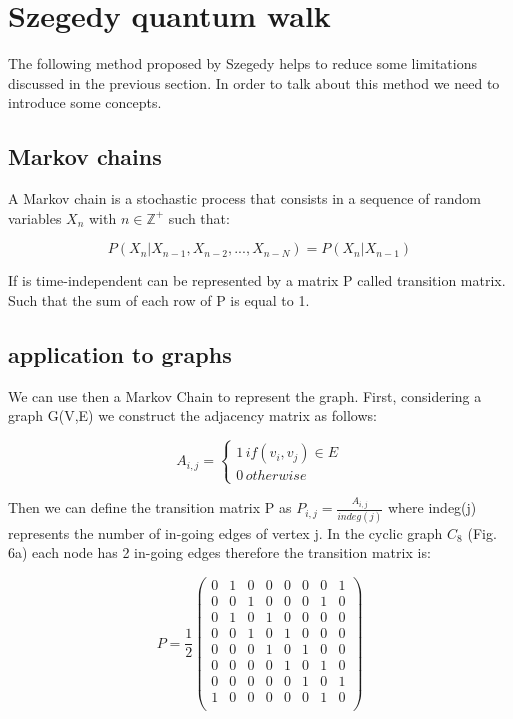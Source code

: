 \section{Szegedy quantum walk}

The following method proposed by Szegedy helps to reduce some limitations discussed in the previous section. In order to 
talk about this method we need to introduce some concepts.

\subsection{Markov chains}

A Markov chain is a stochastic process that consists in a sequence of random variables $X_{n}$ with $n \in \mathbb{Z}^{+}$
such that:

\begin{equation}
    \scriptstyle P(X_{n} | X_{n-1}, X_{n-2},...,X_{n-N}) = P(X_{n} | X_{n-1})
\end{equation}

If is time-independent can be represented by a matrix P called transition matrix. Such that the sum of each row of P is equal to 1.

\subsection{application to graphs}

We can use then a Markov Chain to represent the graph. First, considering a graph G(V,E) we construct the adjacency matrix
as follows:

\begin{equation}
    A_{i,j} = 
    \begin{cases} 
        1\, if (v_{i}, v_{j}) \in E \\
        0\, otherwise
    \end{cases}
\end{equation}

Then we can define the transition matrix P as $P_{i,j} = \frac{A_{i,j}}{indeg(j)}$ where indeg(j) 
represents the number of in-going edges of vertex j. In the 
cyclic graph $C_{8}$ (Fig. 6a) each node has 2 in-going edges therefore the transition matrix is:

\begin{equation*}
    P = \frac{1}{2}
    \begin{pmatrix}
    0 & 1 & 0 & 0 & 0 & 0 & 0 & 1 \\
    0 & 0 & 1 & 0 & 0 & 0 & 1 & 0 \\
    0 & 1 & 0 & 1 & 0 & 0 & 0 & 0 \\
    0 & 0 & 1 & 0 & 1 & 0 & 0 & 0 \\
    0 & 0 & 0 & 1 & 0 & 1 & 0 & 0 \\
    0 & 0 & 0 & 0 & 1 & 0 & 1 & 0 \\
    0 & 0 & 0 & 0 & 0 & 1 & 0 & 1 \\
    1 & 0 & 0 & 0 & 0 & 0 & 1 & 0 \\
    \end{pmatrix}
\end{equation*}

